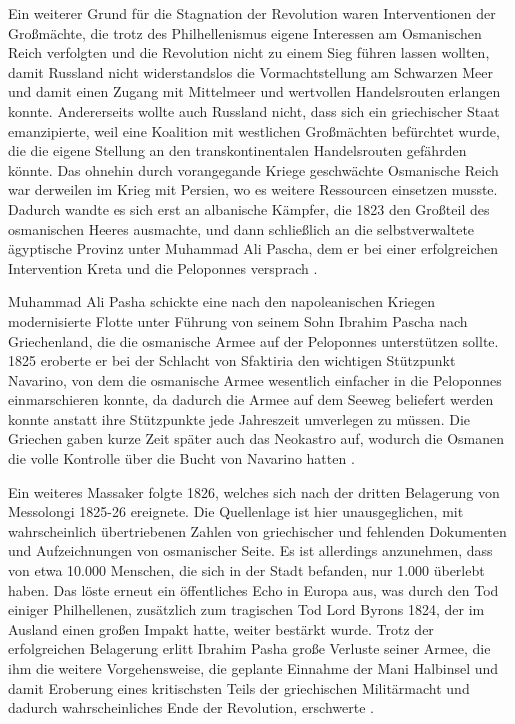 \documentclass[preprint]{geomorphica} %
\begin{document}
Ein weiterer Grund für die Stagnation der Revolution waren Interventionen der Großmächte, die trotz des Philhellenismus eigene Interessen am Osmanischen Reich verfolgten und die Revolution nicht zu einem Sieg führen lassen wollten, damit Russland nicht widerstandslos die Vormachtstellung am Schwarzen Meer und damit einen Zugang mit Mittelmeer und wertvollen Handelsrouten erlangen konnte.
Andererseits wollte auch Russland nicht, dass sich ein griechischer Staat emanzipierte, weil eine Koalition mit westlichen Großmächten befürchtet wurde, die die eigene Stellung an den transkontinentalen Handelsrouten gefährden könnte.
Das ohnehin durch vorangegande Kriege geschwächte Osmanische Reich war derweilen im Krieg mit Persien, wo es weitere Ressourcen einsetzen musste.
Dadurch wandte es sich erst an albanische Kämpfer, die 1823 den Großteil des osmanischen Heeres ausmachte, und dann schließlich an die selbstverwaltete ägyptische Provinz unter Muhammad Ali Pascha, dem er bei einer erfolgreichen Intervention Kreta und die Peloponnes versprach \cite{Zelepos2015, Brewer2001, Dakin1973, Clair2008}.

Muhammad Ali Pasha schickte eine nach den napoleanischen Kriegen modernisierte Flotte unter Führung von seinem Sohn Ibrahim Pascha nach Griechenland, die die osmanische Armee auf der Peloponnes unterstützen sollte.
1825 eroberte er bei der Schlacht von Sfaktiria den wichtigen Stützpunkt Navarino, von dem die osmanische Armee wesentlich einfacher in die Peloponnes einmarschieren konnte, da dadurch die Armee auf dem Seeweg beliefert werden konnte anstatt ihre Stützpunkte jede Jahreszeit umverlegen zu müssen.
Die Griechen gaben kurze Zeit später auch das Neokastro auf, wodurch die Osmanen die volle Kontrolle über die Bucht von Navarino hatten \cite{Brewer2001}.

Ein weiteres Massaker folgte 1826, welches sich nach der dritten Belagerung von Messolongi 1825-26 ereignete.
Die Quellenlage ist hier unausgeglichen, mit wahrscheinlich übertriebenen Zahlen von griechischer und fehlenden Dokumenten und Aufzeichnungen von osmanischer Seite.
Es ist allerdings anzunehmen, dass von etwa 10.000 Menschen, die sich in der Stadt befanden, nur 1.000 überlebt haben.
Das löste erneut ein öffentliches Echo in Europa aus, was durch den Tod einiger Philhellenen, zusätzlich zum tragischen Tod Lord Byrons 1824, der im Ausland einen großen Impakt hatte, weiter bestärkt wurde.
Trotz der erfolgreichen Belagerung erlitt Ibrahim Pasha große Verluste seiner Armee, die ihm die weitere Vorgehensweise, die geplante Einnahme der Mani Halbinsel und damit Eroberung eines kritischsten Teils der griechischen Militärmacht und dadurch wahrscheinliches Ende der Revolution, erschwerte \cite{Zelepos2015, Brewer2001, Dakin1973, Clair2008}.
\end{document}

